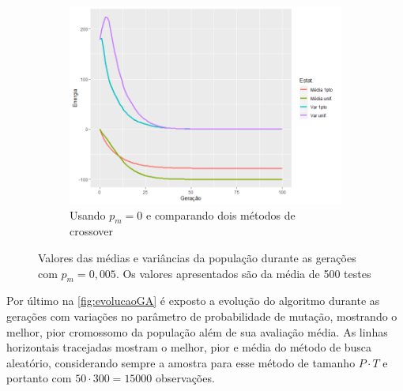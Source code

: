 \begin{figure}[h!]
\begin{subfigure}[b]{0.67\linewidth}
		\includegraphics[width=\linewidth]{imagens/comp_cross_1pto_unif.png}
		\caption{Usando \(p_m = 0\) e comparando dois métodos de crossover}
	\end{subfigure}
\caption{Valores das médias e variâncias da população durante as gerações com \(p_m=0,005\). Os valores apresentados são da média de 500 testes}
	\label{fig:distribuicao_ising_geracoes}
\end{figure}

Por último na \autoref{fig:evolucaoGA} é exposto a evolução do algoritmo durante as gerações com variações no parâmetro de probabilidade de mutação, mostrando o melhor, pior cromossomo da população além de sua avaliação média. As linhas horizontais tracejadas mostram o melhor, pior e média do método de busca aleatório, considerando sempre a amostra para esse método de tamanho \(P \cdot T\) e portanto com \(50 \cdot 300 = 15000\) observações.

